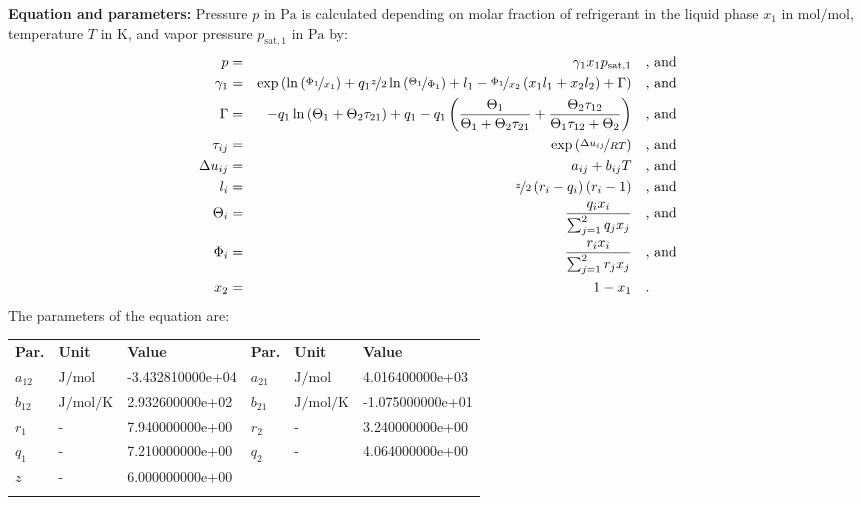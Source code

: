 \textbf{Equation and parameters:}
\newline
%
Pressure $p$ in $\si{\pascal}$ is calculated depending on molar fraction of refrigerant in the liquid phase $x_1$ in $\si{\mole\per\mole}$, temperature $T$ in $\si{\kelvin}$, and vapor pressure $p_\mathrm{sat,1}$ in $\si{\pascal}$ by:
%
\begin{equation*}
\begin{split}
p &=& \gamma_1 x_1 p_\mathrm{sat,1} & \quad\text{, and} \\
\gamma_1 &=& \exp \left( \ln \left( \nicefrac{\Phi_1}{x_1} \right) + q_1 \nicefrac{z}{2} \ln \left( \nicefrac{\Theta_1}{\Phi_1} \right) + l_1 - \nicefrac{\Phi_1}{x_2} \left( x_1 l_1 + x_2 l_2 \right) + \Gamma \right) & \quad\text{, and} \\
\Gamma &=& - q_1 \ln \left( \Theta_1 + \Theta_2 \tau_{21} \right) + q_1 - q_1 \left( \frac{\Theta_1}{\Theta_1 + \Theta_2 \tau_{21}} + \frac{\Theta_2 \tau_{12}}{\Theta_1 \tau_{12} + \Theta_2} \right) & \quad\text{, and} \\
\tau_{ij} &=& \exp \left( \nicefrac{\Delta u_{ij}}{R T} \right) & \quad\text{, and} \\
\Delta u_{ij} &=& a_{ij} + b_{ij} T & \quad\text{, and} \\
l_i &=& \nicefrac{z}{2} \left( r_i - q_i \right) \left(r_i - 1 \right) & \quad\text{, and} \\
\Theta_i &=& \frac{q_i x_i}{\sum_{j=1}^{2} q_j x_j} & \quad\text{, and} \\
\Phi_i &=& \frac{r_i x_i}{\sum_{j=1}^{2} r_j x_j} & \quad\text{, and} \\
x_2 &=& 1 - x_1  & \quad\text{.} \\
\end{split}
\end{equation*}
%
The parameters of the equation are:
%
\begin{longtable}[l]{lll|lll}
\toprule
\addlinespace
\textbf{Par.} & \textbf{Unit} & \textbf{Value} &	\textbf{Par.} & \textbf{Unit} & \textbf{Value} \\
\addlinespace
\midrule
\endhead

\bottomrule
\endfoot
\bottomrule
\endlastfoot
\addlinespace

$a_{12}$ & $\si{\joule\per\mole}$ & -3.432810000e+04 & $a_{21}$ & $\si{\joule\per\mole}$ & 4.016400000e+03 \\
$b_{12}$ & $\si{\joule\per\mole\per\kelvin}$ & 2.932600000e+02 & $b_{21}$ & $\si{\joule\per\mole\per\kelvin}$ & -1.075000000e+01 \\
$r_{1}$ & - & 7.940000000e+00 & $r_{2}$ & - & 3.240000000e+00 \\
$q_{1}$ & - & 7.210000000e+00 & $q_{2}$ & - & 4.064000000e+00 \\
$z$ & - & 6.000000000e+00 & & &  \\

\addlinespace\end{longtable}

